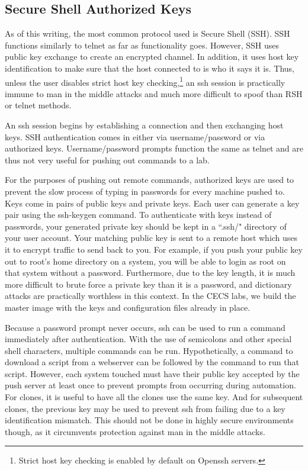 \subsection{Secure Shell Authorized Keys}
As of this writing, the most common protocol used is Secure Shell (SSH).  SSH functions similarly to telnet as far as functionality goes.  However, SSH uses public key exchange to create an encrypted channel.  In addition, it uses host key identification to make sure that the host connected to is who it says it is.  Thus, unless the user disables strict host key checking,\footnote{Strict host key checking is enabled by default on Openssh servers.} an ssh session is practically immune to man in the middle attacks and much more difficult to spoof than RSH or telnet methods.   

An ssh session begins by establishing a connection and then exchanging host keys.  SSH authentication comes in either via username/password or via authorized keys.  Username/password prompts function the same as telnet and are thus not very useful for pushing out commands to a lab.

For the purposes of pushing out remote commands, authorized keys are used to prevent the slow process of typing in passwords for every machine pushed to.  Keys come in pairs of public keys and private keys.  Each user can generate a key pair using the ssh-keygen command.  To authenticate with keys instead of passwords, your generated private key should be kept in a ``.ssh/" directory of your user account.  Your matching public key is sent to a remote host which uses it to encrypt traffic to send back to you.  For example, if you push your public key out to root's home directory on a system, you will be able to login as root on that system without a password.  Furthermore, due to the key length, it is much more difficult to brute force a private key than it is a password, and dictionary attacks are practically worthless in this context.  In the CECS labs, we build the master image with the keys and configuration files already in place.  

Because a password prompt never occurs, ssh can be used to run a command immediately after authentication.  With the use of semicolons and other special shell characters, multiple commands can be run.  Hypothetically, a command to download a script from a webserver can be followed by the command to run that script.  However, each system touched must have their public key accepted by the push server at least once to prevent prompts from occurring during automation.  For clones, it is useful to have all the clones use the same key.  And for subsequent clones, the previous key may be used to prevent ssh from failing due to a key identification mismatch.  This should not be done in highly secure environments though, as it circumvents protection against man in the middle attacks.  

